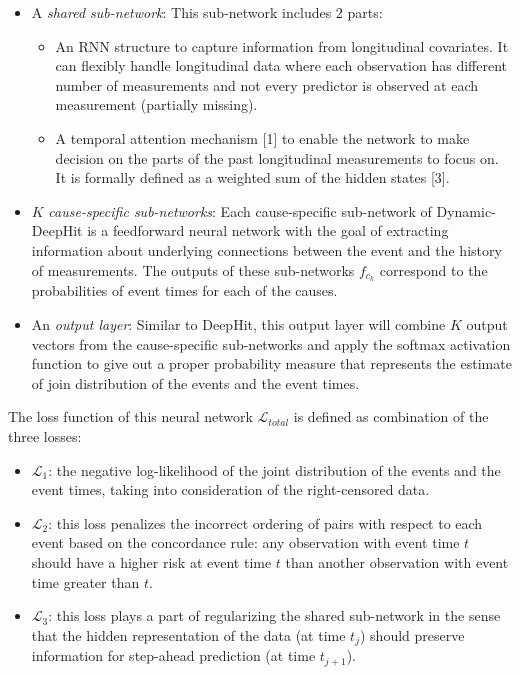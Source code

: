 \documentclass[
]{article}
\providecommand{\tightlist}{%
  \setlength{\itemsep}{0pt}\setlength{\parskip}{0pt}}
\begin{document}
\begin{itemize}
\tightlist
\item
  A \emph{shared sub-network}: This sub-network includes 2 parts:

  \begin{itemize}
  \tightlist
  \item
    An RNN structure to capture information from longitudinal covariates. It can flexibly handle longitudinal data where each observation has different number of measurements and not every predictor is observed at each measurement (partially missing).
  \item
    A temporal attention mechanism {[}1{]} to enable the network to make decision on the parts of the past longitudinal measurements to focus on. It is formally defined as a weighted sum of the hidden states {[}3{]}.
  \end{itemize}
\item
  \(K\) \emph{cause-specific sub-networks}: Each cause-specific sub-network of Dynamic-DeepHit is a feedforward neural network with the goal of extracting information about underlying connections between the event and the history of measurements. The outputs of these sub-networks \(f_{c_k}\) correspond to the probabilities of event times for each of the causes.
\item
  An \emph{output layer}: Similar to DeepHit, this output layer will combine \(K\) output vectors from the cause-specific sub-networks and apply the softmax activation function to give out a proper probability measure that represents the estimate of join distribution of the events and the event times.
\end{itemize}

The loss function of this neural network \(\mathcal{L}_{total}\) is defined as combination of the three losses:
\vspace{-0.45cm}

\begin{itemize}
\tightlist
\item
  \(\mathcal{L}_1\): the negative log-likelihood of the joint distribution of the events and the event times, taking into consideration of the right-censored data.
\item
  \(\mathcal{L}_2\): this loss penalizes the incorrect ordering of pairs with respect to each event based on the concordance rule: any observation with event time \(t\) should have a higher risk at event time \(t\) than another observation with event time greater than \(t\).
\item
  \(\mathcal{L}_3\): this loss plays a part of regularizing the shared sub-network in the sense that the hidden representation of the data (at time \(t_j\)) should preserve information for step-ahead prediction (at time \(t_{j + 1}\)).
\end{itemize}
\end{document}
